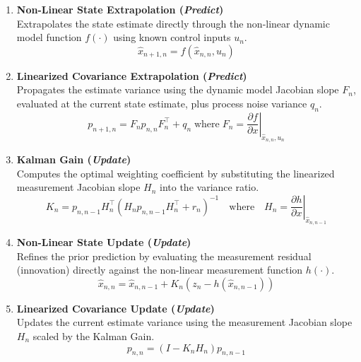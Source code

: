 \begin{enumerate}[label=\textbf{Step \arabic*:}, leftmargin=*, itemsep=1em]
	
	\item \textbf{Non-Linear State Extrapolation (\emph{Predict})}\\
	Extrapolates the state estimate directly through the non-linear dynamic model function $f(\cdot)$ using known control inputs $u_n$.
	\begin{equation}
		\hat{x}_{n+1,n} = f\left(\hat{x}_{n,n}, u_n\right)
	\end{equation}
	
	\item \textbf{Linearized Covariance Extrapolation (\emph{Predict})}\\
	Propagates the estimate variance using the dynamic model Jacobian slope $F_n$, evaluated at the current state estimate, plus process noise variance $q_n$.
	\begin{equation}
		p_{n+1,n} = F_n p_{n,n} F_n^\top + q_n \; \text{where} \; F_n = \left. \frac{\partial f}{\partial x} \right|_{\hat{x}_{n,n}, u_n}
	\end{equation}
	
	\item \textbf{Kalman Gain (\emph{Update})}\\
	Computes the optimal weighting coefficient by substituting the linearized measurement Jacobian slope $H_n$ into the variance ratio.
	\begin{equation}
		K_n = p_{n,n-1} H_n^\top \left(H_n p_{n,n-1} H_n^\top + r_n\right)^{-1} \quad \text{where} \quad H_n = \left. \frac{\partial h}{\partial x} \right|_{\hat{x}_{n,n-1}}
	\end{equation}
	
	\item \textbf{Non-Linear State Update (\emph{Update})}\\
	Refines the prior prediction by evaluating the measurement residual (innovation) directly against the non-linear measurement function $h(\cdot)$.
	\begin{equation}
		\hat{x}_{n,n} = \hat{x}_{n,n-1} + K_n\left(z_n - h\left(\hat{x}_{n,n-1}\right)\right)
	\end{equation}
	
	\item \textbf{Linearized Covariance Update (\emph{Update})}\\
	Updates the current estimate variance using the measurement Jacobian slope $H_n$ scaled by the Kalman Gain.
	\begin{equation}
		p_{n,n} = \left(I - K_n H_n\right) p_{n,n-1}
	\end{equation}
	
\end{enumerate}


